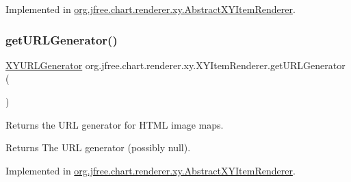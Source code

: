 Implemented in \mbox{\hyperlink{classorg_1_1jfree_1_1chart_1_1renderer_1_1xy_1_1_abstract_x_y_item_renderer_a311620b0daf12b3b8eec598b4d99e93d}{org.\+jfree.\+chart.\+renderer.\+xy.\+Abstract\+X\+Y\+Item\+Renderer}}.

\mbox{\label{interfaceorg_1_1jfree_1_1chart_1_1renderer_1_1xy_1_1_x_y_item_renderer_aa4ef599fb2f7154cade595bca496f98a}} 
\subsubsection{\texorpdfstring{get\+U\+R\+L\+Generator()}{getURLGenerator()}}
{\footnotesize\ttfamily \mbox{\hyperlink{interfaceorg_1_1jfree_1_1chart_1_1urls_1_1_x_y_u_r_l_generator}{X\+Y\+U\+R\+L\+Generator}} org.\+jfree.\+chart.\+renderer.\+xy.\+X\+Y\+Item\+Renderer.\+get\+U\+R\+L\+Generator (\begin{DoxyParamCaption}{ }\end{DoxyParamCaption})}

Returns the U\+RL generator for H\+T\+ML image maps.

\begin{DoxyReturn}{Returns}
The U\+RL generator (possibly null). 
\end{DoxyReturn}


Implemented in \mbox{\hyperlink{classorg_1_1jfree_1_1chart_1_1renderer_1_1xy_1_1_abstract_x_y_item_renderer_aa1506305a9de8a51ac84b1e520169ace}{org.\+jfree.\+chart.\+renderer.\+xy.\+Abstract\+X\+Y\+Item\+Renderer}}.

\mbox{\label{interfaceorg_1_1jfree_1_1chart_1_1renderer_1_1xy_1_1_x_y_item_renderer_ad3313de1104e462f8299b58ce9901cfb}} 
